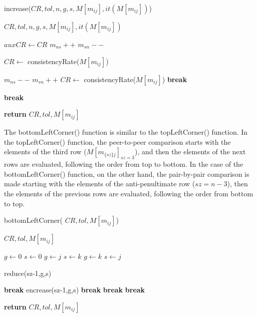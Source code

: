 \documentclass[10pt,fleqn,a4paper,twoside]{article}
\begin{document}
\begin{algorithm}
\caption{increase($CR, tol, n, g, s, M[m_{ij}], it(M[m_{ij}])$)}\label{alg:increase}
	\begin{algorithmic}
	\Require $CR, tol, n, g, s, M[m_{ij}], it(M[m_{ij}])$
	
		\State $auxCR \gets CR$
		\State $m_{ns} ++$
		\State $m_{sn} --$
		
		\State $CR \gets$ consistencyRate($M[m_{ij}]$)
		
			\State $m_{ns} --$
			\State $m_{sn} ++$
			\State $CR \gets$ consistencyRate($M[m_{ij}]$)
			\State \textbf{break}
			
			\State \textbf{break}
		\EndIf
\EndWhile

\State \textbf{return} $CR, tol, M[m_{ij}]$	
	
\end{algorithmic}
\end{algorithm}

The bottomLeftCorner() function is similar to the topLeftCorner() function. In the topLeftCorner() function, the peer-to-peer comparison starts with the elements of the third row ($M[m_{\{sz\}j}]_{sz=3}$), and then the elements of the next rows are evaluated, following the order from top to bottom. In the case of the bottomLeftCorner() function, on the other hand, the pair-by-pair comparison is made starting with the elements of the anti-penultimate row ($sz = n-3$), then the elements of the previous rows are evaluated, following the order from bottom to top.

\begin{algorithm}
\caption{bottomLeftCorner( $CR, tol, M[m_{ij}]$)}\label{alg:bottomLeftCorner}
	\begin{algorithmic}
	\Require $CR, tol, M[m_{ij}]$
	
					\State $g \gets 0$
					\State $s \gets 0$
						\State $g \gets j$
						\State $s \gets k$
						\State $g \gets k$
						\State $s \gets j$
					\EndIf
					
						
						\State reduce(sz-1,g,s)
						
							\State \textbf{break}
							encrease(sz-1,g,s)
								\State \textbf{break}
							\EndIf
						\EndIf
					\EndIf
				\EndFor
					\State \textbf{break}
				\EndIf
			\EndFor
					\State \textbf{break}
				\EndIf	
		\EndFor
	\EndIf
	
	\State \textbf{return} $CR, tol, M[m_{ij}]$

\end{algorithmic}
\end{algorithm}
    
\end{document}
